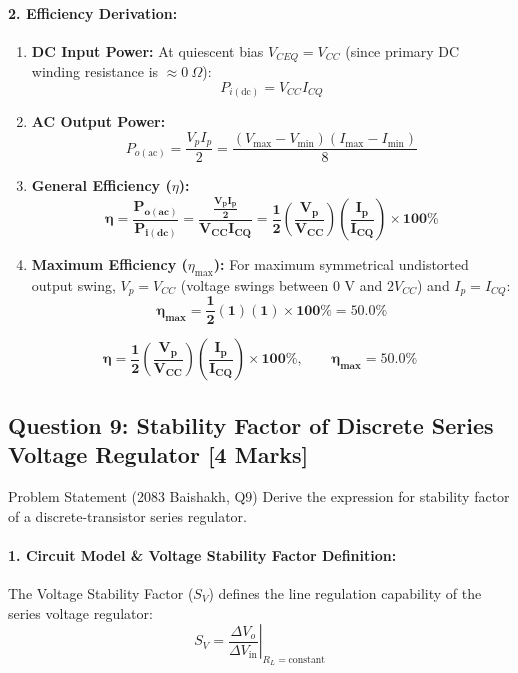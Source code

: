 \documentclass[11pt,a4paper,oneside]{book}
\begin{document}
\paragraph{2. Efficiency Derivation:}
\begin{enumerate}[leftmargin=1.5em]
  \item \textbf{DC Input Power:} At quiescent bias $V_{CEQ} = V_{CC}$ (since primary DC winding resistance is $\approx 0\ \Omega$):
  \[
  P_{i(\text{dc})} = V_{CC} I_{CQ}
  \]
  \item \textbf{AC Output Power:}
  \[
  P_{o(\text{ac})} = \frac{V_p I_p}{2} = \frac{(V_{\max} - V_{\min})(I_{\max} - I_{\min})}{8}
  \]
  \item \textbf{General Efficiency ($\eta$):}
  \[
  \mathbf{\eta = \frac{P_{o(\text{ac})}}{P_{i(\text{dc})}} = \frac{\frac{V_p I_p}{2}}{V_{CC} I_{CQ}} = \frac{1}{2} \left(\frac{V_p}{V_{CC}}\right) \left(\frac{I_p}{I_{CQ}}\right) \times 100\%}
  \]
  \item \textbf{Maximum Efficiency ($\eta_{\max}$):} For maximum symmetrical undistorted output swing, $V_p = V_{CC}$ (voltage swings between $0\text{ V}$ and $2V_{CC}$) and $I_p = I_{CQ}$:
  \[
  \mathbf{\eta_{\max} = \frac{1}{2} (1)(1) \times 100\% = 50.0\%}
  \]
\end{enumerate}

\begin{answerbox}
$$\mathbf{\eta = \frac{1}{2} \left(\frac{V_p}{V_{CC}}\right) \left(\frac{I_p}{I_{CQ}}\right) \times 100\%, \qquad \eta_{\max} = 50.0\%}$$
\end{answerbox}

\vspace{0.6cm}

\subsection{Question 9: Stability Factor of Discrete Series Voltage Regulator [4 Marks]}
\begin{questionbox}{Problem Statement (2083 Baishakh, Q9)}
Derive the expression for stability factor of a discrete-transistor series regulator.
\end{questionbox}

\paragraph{1. Circuit Model \& Voltage Stability Factor Definition:}
The Voltage Stability Factor ($S_V$) defines the line regulation capability of the series voltage regulator:
\[
S_V = \left.\frac{\Delta V_o}{\Delta V_{\text{in}}}\right|_{R_L = \text{constant}}
\]
\end{document}
